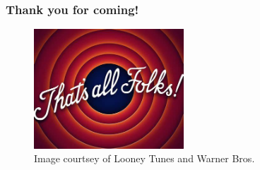 \documentclass[hyperref={colorlinks,citecolor=blue,linkcolor=blue,urlcolor=blue}, aspectratio=1610]{beamer}
\begin{document}
\begin{frame}
  \frametitle{Thank you for coming!}
  \centering
  \begin{figure}
    \includegraphics[width=0.5\textwidth]{that's_all_folks.jpeg}
    \caption{Image courtsey of Looney Tunes\texttrademark{} and Warner Bros.\texttrademark{}}
  \end{figure}
\end{frame}
\end{document}
